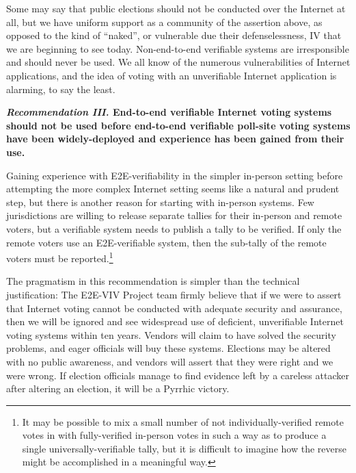Some may say that public elections should not be conducted over the
Internet at all, but we have uniform support as a community of the
assertion above, as opposed to the kind of ``naked'', or vulnerable
due their defenselessness, IV that we are beginning to see
today. Non-end-to-end verifiable systems are irresponsible and should
never be used. We all know of the numerous vulnerabilities of Internet
applications, and the idea of voting with an unverifiable Internet
application is alarming, to say the least.

\begin{center}
  \textbf{\emph{Recommendation III.} End-to-end verifiable Internet
    voting systems should not be used before end-to-end verifiable
    poll-site voting systems have been widely-deployed and experience
    has been gained from their use.}
\end{center}

Gaining experience with E2E-verifiability in the simpler in-person
setting before attempting the more complex Internet setting seems like
a natural and prudent step, but there is another reason for starting
with in-person systems.  Few jurisdictions are willing to release
separate tallies for their in-person and remote voters, but a
verifiable system needs to publish a tally to be verified.  If only
the remote voters use an E2E-verifiable system, then the sub-tally of
the remote voters must be reported.\footnote{It may be possible to mix
  a small number of not individually-verified remote votes in with
  fully-verified in-person votes in such a way as to produce a single
  universally-verifiable tally, but it is difficult to imagine how the
  reverse might be accomplished in a meaningful way.}
 
The pragmatism in this recommendation is simpler than the technical
justification: The E2E-VIV Project team firmly believe that if we
were to assert that Internet voting cannot be conducted with adequate
security and assurance, then we will be ignored and see widespread use
of deficient, unverifiable Internet voting systems within ten years.
Vendors will claim to have solved the security problems, and eager
officials will buy these systems.  Elections may be altered with no
public awareness, and vendors will assert that they were right and we
were wrong.  If election officials manage to find
evidence left by a careless attacker after altering an election, it
will be a Pyrrhic victory.
 
